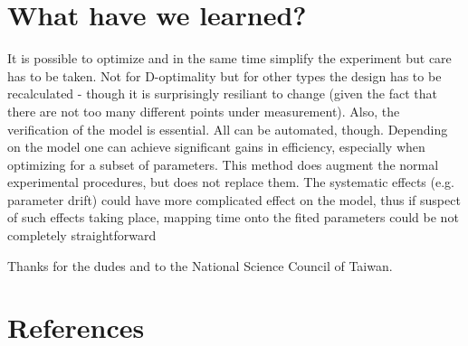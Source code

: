 \documentclass[12pt]{iopart}
\begin{document}
\section{What have we learned?}

It is possible to optimize and in the same time simplify the experiment but care has to be taken. Not for D-optimality but for other types the design has to be recalculated - though it is surprisingly resiliant to change (given the fact that there are not too many different points under measurement). Also, the verification of the model is essential. All can be automated, though. Depending on the model one can achieve significant gains in efficiency, especially when optimizing for a subset of parameters. This method does augment the normal experimental procedures, but does not replace them. The systematic effects (e.g. parameter drift) could have more complicated effect on the model, thus if suspect of such effects taking place, mapping time onto the fited parameters could be not completely straightforward


\ack Thanks for the dudes and to the National Science Council of Taiwan.

\section*{References}


\end{document}
